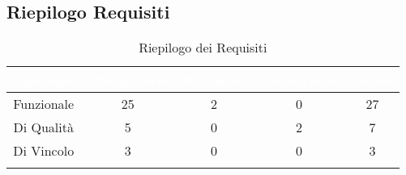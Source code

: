 \subsection{Riepilogo Requisiti}\label{Riepilogo}
\begin{center}
\begin{longtable}[c]{|c|c|c|c|c|}
\hline
\rowcolor{bluelogo}\textbf{\textcolor{white}{Tipologia}} & \textbf{\textcolor{white}{Obbligatorio}} & \textbf{\textcolor{white}{Opzionale}} & \textbf{\textcolor{white}{Desiderabile}} & \textbf{\textcolor{white}{Totale}}\\
\hline \hline
\endhead
Funzionale & 25 & 2 & 0 & 27\\
\hline
\rowcolor{grigio}Di Qualità & 5 & 0 & 2 & 7\\
\hline
Di Vincolo & 3 & 0 & 0 & 3\\
\hline
\caption{Riepilogo dei Requisiti}
\end{longtable}
\end{center}